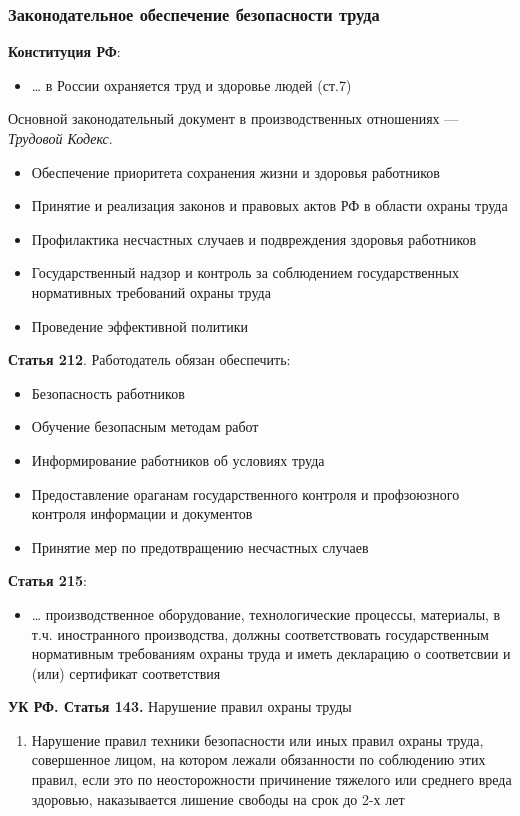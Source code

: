 \documentclass[a4paper, 14pt]{extarticle}
\begin{document}
\subsubsection*{Законодательное обеспечение безопасности труда}
\textbf{Конституция РФ}:
\begin{itemize}
    \item \ldots{} в России охраняется труд и здоровье людей (ст.7)
\end{itemize}
Основной законодательный документ в производственных отношениях --- \textit{Трудовой Кодекс}.
\begin{itemize}
    \item Обеспечение приоритета сохранения жизни и здоровья работников
    \item Принятие и реализация законов и правовых актов РФ в области охраны труда
    \item Профилактика несчастных случаев и подвреждения здоровья работников
    \item Государственный надзор и контроль за соблюдением государственных нормативных требований охраны труда
    \item Проведение эффективной политики
\end{itemize}
\textbf{Статья 212}. Работодатель обязан обеспечить:
\begin{itemize}
    \item Безопасность работников
    \item Обучение безопасным методам работ
    \item Информирование работников об условиях труда
    \item Предоставление ораганам государственного контроля и профзоюзного контроля информации и документов
    \item Принятие мер по предотвращению несчастных случаев
\end{itemize}
\textbf{Статья 215}:
\begin{itemize}
    \item \ldots{} производственное оборудование, технологические процессы, материалы, в т.ч. иностранного производства, должны соответствовать государственным нормативным требованиям охраны труда и иметь декларацию о соответсвии и (или) сертификат соответствия
\end{itemize}

\textbf{УК РФ. Статья 143.} Нарушение правил охраны труды
\begin{enumerate}
    \item Нарушение правил техники безопасности или иных правил охраны труда, совершенное лицом, на котором лежали обязанности по соблюдению этих правил, если это по неосторожности причинение тяжелого или среднего вреда здоровью, наказывается лишение свободы на срок до 2-х лет
\end{enumerate}
\end{document}
